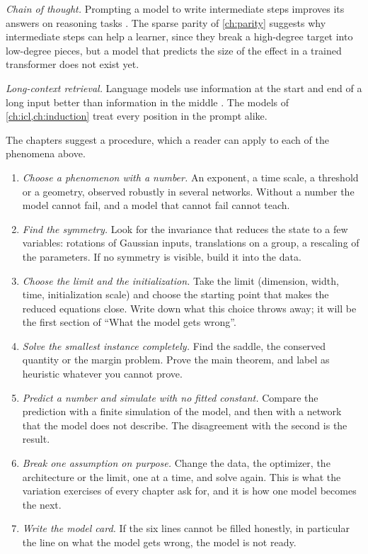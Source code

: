 \begin{refsection}
\emph{Chain of thought.} Prompting a model to write intermediate steps improves its answers on reasoning tasks \parencite{WeiEtAl2022}. The sparse parity of \cref{ch:parity} suggests why intermediate steps can help a learner, since they break a high-degree target into low-degree pieces, but a model that predicts the size of the effect in a trained transformer does not exist yet.

\emph{Long-context retrieval.} Language models use information at the start and end of a long input better than information in the middle \parencite{LiuEtAl2024}. The models of \cref{ch:icl,ch:induction} treat every position in the prompt alike.


The chapters suggest a procedure, which a reader can apply to each of the phenomena above.

\begin{enumerate}
\item \emph{Choose a phenomenon with a number.} An exponent, a time scale, a threshold or a geometry, observed robustly in several networks. Without a number the model cannot fail, and a model that cannot fail cannot teach.
\item \emph{Find the symmetry.} Look for the invariance that reduces the state to a few variables: rotations of Gaussian inputs, translations on a group, a rescaling of the parameters. If no symmetry is visible, build it into the data.
\item \emph{Choose the limit and the initialization.} Take the limit (dimension, width, time, initialization scale) and choose the starting point that makes the reduced equations close. Write down what this choice throws away; it will be the first section of ``What the model gets wrong''.
\item \emph{Solve the smallest instance completely.} Find the saddle, the conserved quantity or the margin problem. Prove the main theorem, and label as heuristic whatever you cannot prove.
\item \emph{Predict a number and simulate with no fitted constant.} Compare the prediction with a finite simulation of the model, and then with a network that the model does not describe. The disagreement with the second is the result.
\item \emph{Break one assumption on purpose.} Change the data, the optimizer, the architecture or the limit, one at a time, and solve again. This is what the variation exercises of every chapter ask for, and it is how one model becomes the next.
\item \emph{Write the model card.} If the six lines cannot be filled honestly, in particular the line on what the model gets wrong, the model is not ready.
\end{enumerate}


\end{refsection}
